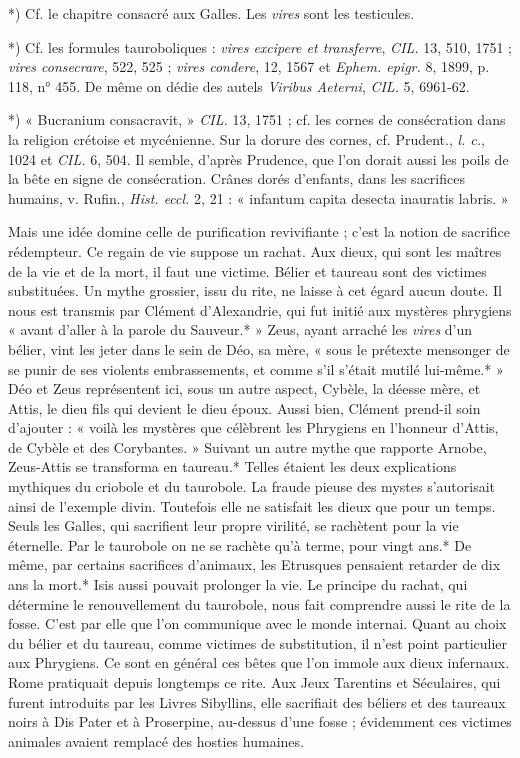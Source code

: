 \documentclass[a4paper, 11pt, oneside, polutonikogreek, french]{article}
\begin{document}
*) Cf. le chapitre consacré aux Galles. Les \emph{vires} sont les testicules.

*) Cf. les formules tauroboliques : \emph{vires excipere et transferre}, \emph{CIL.} 13, 510, 1751 ; \emph{vires consecrare}, 522, 525 ; \emph{vires condere}, 12, 1567 et \emph{Ephem. epigr.} 8, 1899, p. 118, n° 455. De même on dédie des autels \emph{Viribus Aeterni}, \emph{CIL.} 5, 6961-62.

*) « Bucranium consacravit, » \emph{CIL.} 13, 1751 ; cf. les cornes de consécration dans la religion crétoise et mycénienne. Sur la dorure des cornes, cf. Prudent., \emph{l. c.}, 1024 et \emph{CIL.} 6, 504. Il semble, d'après Prudence, que l'on dorait aussi les poils de la bête en signe de consécration. Crânes dorés d'enfants, dans les sacrifices humains, v. Rufin., \emph{Hist. eccl.} 2, 21 : « infantum capita desecta inauratis labris. »

Mais une idée domine celle de purification revivifiante ; c'est la notion de sacrifice rédempteur. Ce regain de vie suppose un rachat. Aux dieux, qui sont les maîtres de la vie et de la mort, il faut une victime. Bélier et taureau sont des victimes substituées. Un mythe grossier, issu du rite, ne laisse à cet égard aucun doute. Il nous est transmis par Clément d'Alexandrie, qui fut initié aux mystères phrygiens « avant d'aller à la parole du Sauveur.* » Zeus, ayant arraché les \emph{vires} d'un bélier, vint les jeter dans le sein de Déo, sa mère, « sous le prétexte mensonger de se punir de ses violents embrassements, et comme s'il s'était mutilé lui-même.* » Déo et Zeus représentent ici, sous un autre aspect, Cybèle, la déesse mère, et Attis, le dieu fils qui devient le dieu époux. Aussi bien, Clément prend-il soin d'ajouter : « voilà les mystères que célèbrent les Phrygiens en l'honneur d'Attis, de Cybèle et des Corybantes. » Suivant un autre mythe que rapporte Arnobe, Zeus-Attis se transforma en taureau.* Telles étaient les deux explications mythiques du criobole et du taurobole. La fraude pieuse des mystes s'autorisait ainsi de l'exemple divin. Toutefois elle ne satisfait les dieux que pour un temps. Seuls les Galles, qui sacrifient leur propre virilité, se rachètent pour la vie éternelle. Par le taurobole on ne se rachète qu'à terme, pour vingt ans.* De même, par certains sacrifices d'animaux, les Etrusques pensaient retarder de dix ans la mort.* Isis aussi pouvait prolonger la vie. Le principe du rachat, qui détermine le renouvellement du taurobole, nous fait comprendre aussi le rite de la fosse. C'est par elle que l'on communique avec le monde internai. Quant au choix du bélier et du taureau, comme victimes de substitution, il n'est point particulier aux Phrygiens. Ce sont en général ces bêtes que l'on immole aux dieux infernaux. Rome pratiquait depuis longtemps ce rite. Aux Jeux Tarentins et Séculaires, qui furent introduits par les Livres Sibyllins, elle sacrifiait des béliers et des taureaux noirs à Dis Pater et à Proserpine, au-dessus d'une fosse ; évidemment ces victimes animales avaient remplacé des hosties humaines.
\end{document}
